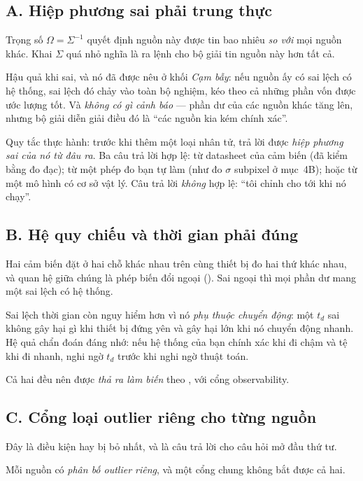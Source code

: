 \documentclass[../../vslam.tex]{subfiles}
\begin{document}
\subsection{A. Hiệp phương sai phải trung thực}

Trọng số \(\Omega = \Sigma^{-1}\) quyết định nguồn này được tin bao nhiêu \emph{so với} mọi nguồn khác. Khai \(\Sigma\) quá nhỏ nghĩa là ra lệnh cho bộ giải tin nguồn này hơn tất cả.

Hậu quả khi sai, và nó đã được nêu ở  khối \emph{Cạm bẫy}: nếu nguồn ấy có sai lệch có hệ thống, sai lệch đó chảy vào toàn bộ nghiệm, kéo theo cả những phần vốn được ước lượng tốt. Và \emph{không có gì cảnh báo} --- phần dư của các nguồn khác tăng lên, nhưng bộ giải diễn giải điều đó là ``các nguồn kia kém chính xác''.

Quy tắc thực hành: trước khi thêm một loại nhân tử, trả lời được \emph{hiệp phương sai của nó từ đâu ra}. Ba câu trả lời hợp lệ: từ datasheet của cảm biến (đã kiểm bằng đo đạc); từ một phép đo bạn tự làm (như đo \(\sigma\) subpixel ở  mục~4B); hoặc từ một mô hình có cơ sở vật lý. Câu trả lời \emph{không} hợp lệ: ``tôi chỉnh cho tới khi nó chạy''.

\subsection{B. Hệ quy chiếu và thời gian phải đúng}

Hai cảm biến đặt ở hai chỗ khác nhau trên cùng thiết bị đo hai thứ khác nhau, và quan hệ giữa chúng là phép biến đổi ngoại (). Sai ngoại thì mọi phần dư mang một sai lệch có hệ thống.

Sai lệch thời gian còn nguy hiểm hơn vì nó \emph{phụ thuộc chuyển động}: một \(t_d\) sai không gây hại gì khi thiết bị đứng yên và gây hại lớn khi nó chuyển động nhanh. Hệ quả chẩn đoán đáng nhớ: nếu hệ thống của bạn chính xác khi đi chậm và tệ khi đi nhanh, nghi ngờ \(t_d\) trước khi nghi ngờ thuật toán.

Cả hai đều nên được \emph{thả ra làm biến} theo , với cổng observability.

\subsection{C. Cổng loại outlier riêng cho từng nguồn}

Đây là điều kiện hay bị bỏ nhất, và là câu trả lời cho câu hỏi mở đầu thứ tư.

Mỗi nguồn có \emph{phân bố outlier riêng}, và một cổng chung không bắt được cả hai.
\end{document}
